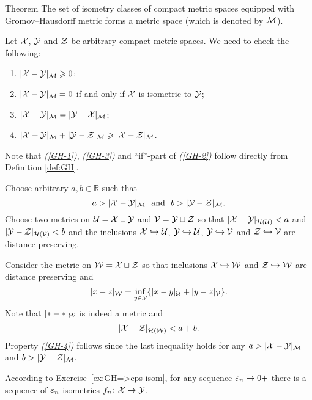 \begin{thm}{Theorem}\label{thm:GH-is-a-metric}
The set of isometry classes of compact metric spaces equipped with Gromov--Hausdorff metric forms a metric space (which is denoted by $\mathcal{M}$).
\end{thm}

Let $\mathcal{X}$, $\mathcal{Y}$ and $\mathcal{Z}$ be arbitrary  compact metric spaces.
We need to check the following:
\begin{enumerate}[{\it (i)}]
\item\label{GH-1} $|\mathcal{X}-\mathcal{Y}|_{\mathcal{M}}\geqslant 0$;
\item\label{GH-2} $|\mathcal{X}-\mathcal{Y}|_{\mathcal{M}}=0$ if and only if $\mathcal{X}$ is isometric to $\mathcal{Y}$;
\item\label{GH-3} $|\mathcal{X}-\mathcal{Y}|_{\mathcal{M}}=|\mathcal{Y}-\mathcal{X}|_{\mathcal{M}}$;
\item\label{GH-4} $|\mathcal{X}-\mathcal{Y}|_{\mathcal{M}}+|\mathcal{Y}-\mathcal{Z}|_{\mathcal{M}}\geqslant |\mathcal{X}-\mathcal{Z}|_{\mathcal{M}}$.
\end{enumerate}


Note that {\it (\ref{GH-1})}, {\it(\ref{GH-3})} and ``if''-part of {\it(\ref{GH-2})} follow directly from Definition \ref{def:GH}.

Choose arbitrary $a,b \in \mathbb{R}$ such that
$$a>|\spc{X}-\spc{Y}|_{\spc{M}}\ \ \text{and}\ \  b>|\spc{Y}-\spc{Z}|_{\spc{M}}.$$
Choose two metrics on $\mathcal{U}=\mathcal{X}\sqcup \mathcal{Y}$ and $\mathcal{V}=\mathcal{Y}\sqcup \mathcal{Z}$ so that
$|\mathcal{X}-\mathcal{Y}|_{\mathcal{H}(\mathcal{U})}<a$ and $|\mathcal{Y}-\mathcal{Z}|_{\mathcal{H}(\mathcal{V})}<b$ 
and the inclusions $\mathcal{X}\hookrightarrow \mathcal{U}$, $\mathcal{Y}\hookrightarrow \mathcal{U}$, $\mathcal{Y}\hookrightarrow \mathcal{V}$ and $\mathcal{Z}\hookrightarrow \mathcal{V}$ are distance preserving.

Consider the metric on $\mathcal{W}=\mathcal{X}\sqcup \mathcal{Z}$ 
so that inclusions $\mathcal{X}\hookrightarrow \mathcal{W}$ and $\mathcal{Z}\hookrightarrow \mathcal{W}$ are distance preserving
and 
$$|x-z|_{\mathcal{W}}=\inf_{y\in \mathcal{Y}}\{|x-y|_{\mathcal{U}}+|y-z|_{\mathcal{V}}\}.$$
Note that $|{*}-{*}|_{\mathcal{W}}$ is indeed a metric and 
$$|\mathcal{X}-\mathcal{Z}|_{\mathcal{H}(\mathcal{W})}<a+b.$$
Property {\it (\ref{GH-4})} follows since the last inequality holds for any $a>|\spc{X}\z-\spc{Y}|_{\spc{M}}$ and $b>|\mathcal{Y}-\mathcal{Z}|_{\mathcal{M}}$.


According to Exercise~\ref{ex:GH=>eps-isom},
for any sequence $\varepsilon_n\to0+$ there is a sequence of $\varepsilon_n$-isometries 
$f_n\colon\mathcal{X}\to \mathcal{Y}$.

